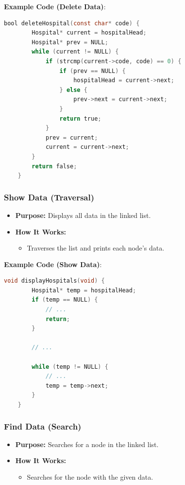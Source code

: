 \documentclass[12pt,a4paper]{report}
\begin{document}
\normalsize \textbf{Example Code (Delete Data)}:
\begin{lstlisting}[language=C, caption=Delete Hospital]
    bool deleteHospital(const char* code) {
        Hospital* current = hospitalHead;
        Hospital* prev = NULL;
        while (current != NULL) {
            if (strcmp(current->code, code) == 0) {
                if (prev == NULL) {
                    hospitalHead = current->next;
                } else {
                    prev->next = current->next;
                }
                return true;
            }
            prev = current;
            current = current->next;
        }
        return false;
    }
\end{lstlisting}

\subsubsection{Show Data (Traversal)}
\begin{itemize}
    \item \normalsize \textbf{Purpose:} Displays all data in the linked list.
    \item \normalsize \textbf{How It Works:}
    \begin{itemize}
        \item Traverses the list and prints each node's data.
    \end{itemize}
\end{itemize}

\normalsize \textbf{Example Code (Show Data)}:
\begin{lstlisting}[language=C, caption=Show Hospitals]
    void displayHospitals(void) {
        Hospital* temp = hospitalHead;
        if (temp == NULL) {
            // ...
            return;
        }

        // ...

        while (temp != NULL) {
            // ...
            temp = temp->next;
        }
    }
\end{lstlisting}

\subsubsection{Find Data (Search)}
\begin{itemize}
    \item \normalsize \textbf{Purpose:} Searches for a node in the linked list.
    \item \normalsize \textbf{How It Works:}
    \begin{itemize}
        \item Searches for the node with the given data.
    \end{itemize}
\end{itemize}
\end{document}
